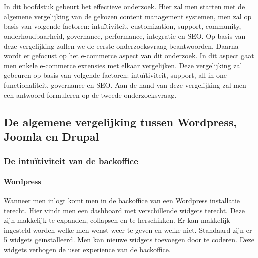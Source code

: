 
\chapter{}
\label{ch:methodologie}


In dit hoofdstuk gebeurt het effectieve onderzoek. Hier zal men starten  met de algemene vergelijking van de gekozen content management systemen, men zal op basis van volgende factoren: intuïtiviteit, customization, support, community, onderhoudbaarheid, governance, performance, integratie en SEO. Op basis van deze vergelijking zullen we de eerste onderzoeksvraag beantwoorden. Daarna wordt er gefocust op het e-commerce aspect van dit onderzoek. In dit aspect gaat men enkele e-commerce extensies met elkaar vergelijken. Deze vergelijking zal gebeuren op basis van volgende factoren: intuïtiviteit, support, all-in-one functionaliteit, governance en SEO. Aan de hand van deze vergelijking zal men een antwoord formuleren op de tweede onderzoeksvraag.  

\section{De algemene vergelijking tussen Wordpress, Joomla en Drupal }
\subsection{De intuïtiviteit van de backoffice}

\subsubsection{Wordpress}
Wanneer men inlogt komt men in de backoffice van een Wordpress installatie terecht. Hier vindt men een dashboard met verschillende widgets terecht. Deze zijn makkelijk te expanden, collapsen en te herschikken. Er kan makkelijk ingesteld worden welke men wenst weer te geven en welke niet. Standaard zijn er 5 widgets geïnstalleerd. Men kan nieuwe widgets toevoegen door te coderen. Deze widgets verhogen de user experience van de backoffice.

